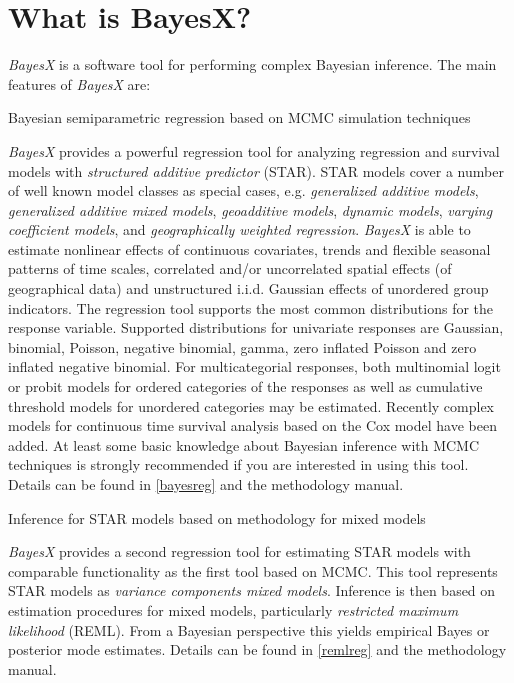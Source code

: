 \chapter{What is BayesX?}

{\em BayesX} is a software tool for performing complex Bayesian
inference. The main features of {\em BayesX} are:

\begin{stanza}{Bayesian semiparametric regression based on MCMC simulation techniques}

{\em BayesX} provides a powerful regression tool for analyzing
regression and survival models with {\em structured additive
predictor} (STAR). STAR models cover a number of well known model
classes as special cases, e.g. {\em generalized additive models},
{\em generalized additive mixed models}, {\em geoadditive models},
{\em dynamic models}, {\em varying coefficient models}, and {\em
geographically weighted regression}. {\em BayesX} is able to
estimate nonlinear effects of continuous covariates, trends and
flexible seasonal patterns of time scales, correlated and/or
uncorrelated spatial effects (of geographical data) and unstructured
i.i.d. Gaussian effects of unordered group indicators. The
regression tool  supports the most common distributions for the
response variable. Supported distributions for univariate responses
are Gaussian, binomial, Poisson, negative binomial, gamma, zero
inflated Poisson and zero inflated negative binomial. For
multicategorial responses, both multinomial logit or probit models
for ordered categories of the responses as well as cumulative
threshold models for unordered categories may be estimated. Recently
complex models for continuous time survival analysis based on the
Cox model have been added. At least some basic knowledge about
Bayesian inference with MCMC techniques is strongly recommended if
you are interested in using this tool. Details can be found in
\autoref{bayesreg} and the methodology manual.
\end{stanza}

\begin{stanza}{Inference for STAR models based on methodology for mixed models}

{\em BayesX} provides a second regression tool for estimating STAR
models with comparable functionality as the first tool based on
MCMC. This tool represents STAR models as {\em variance components
mixed models}. Inference is then based on estimation procedures for
mixed models, particularly {\em restricted maximum likelihood}
(REML). From a Bayesian perspective this yields empirical Bayes or
posterior mode estimates. Details can be found in \autoref{remlreg}
and the methodology manual.
\end{stanza}

